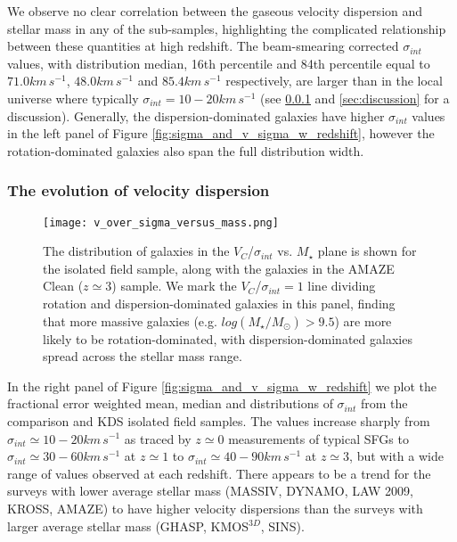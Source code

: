 \documentclass[fleqn,usenatbib]{mnras}
\begin{document}
\noindent
We observe no clear correlation between the gaseous velocity dispersion and stellar mass in any of the sub-samples, highlighting the complicated relationship between these quantities at high redshift.
The beam-smearing corrected $\sigma_{int}$ values, with distribution median, 16th percentile and 84th percentile equal to $71.0km\,s^{-1}$, $48.0km\,s^{-1}$ and $85.4km\,s^{-1}$ respectively, are larger than in the local universe where typically $\sigma_{int} = 10-20km\,s^{-1}$ \citep{Epinat2008a} (see \cref{subsubsec:sigma_evolution} and \cref{sec:discussion} for a discussion).
Generally, the dispersion-dominated galaxies have higher $\sigma_{int}$ values in the left panel of Figure \ref{fig:sigma_and_v_sigma_w_redshift}, however the rotation-dominated galaxies also span the full distribution width.

\subsubsection{The evolution of velocity dispersion}\label{subsubsec:sigma_evolution}

\begin{figure}
    \centering \hspace{-1.13cm}
    \texttt{[image: v\_over\_sigma\_versus\_mass.png]}
    \caption{The distribution of galaxies in the $V_{C}$/$\sigma_{int}$ vs. $M_{\star}$ plane is shown for the isolated field sample, along with the galaxies in the AMAZE Clean ($z\simeq3$) sample.
    We mark the $V_{C}$/$\sigma_{int}=1$ line dividing rotation and dispersion-dominated galaxies in this panel, finding that more massive galaxies (e.g. $log(M_{\star}/M_{\odot}) > 9.5$) are more likely to be rotation-dominated, with dispersion-dominated galaxies spread across the stellar mass range.}
    \label{fig:v_sig_and_v}
\end{figure}

In the right panel of Figure \ref{fig:sigma_and_v_sigma_w_redshift} we plot the fractional error weighted mean, median and distributions of $\sigma_{int}$ from the comparison and KDS isolated field samples.
The values increase sharply from $\sigma_{int}\simeq10-20km\,s^{-1}$ as traced by $z\simeq0$ measurements of typical SFGs to $\sigma_{int}\simeq30-60km\,s^{-1}$ at $z\simeq1$ to $\sigma_{int}\simeq40-90km\,s^{-1}$ at $z\simeq3$, but with a wide range of values observed at each redshift.
There appears to be a trend for the surveys with lower average stellar mass (MASSIV, DYNAMO, LAW 2009, KROSS, AMAZE) to have higher velocity dispersions than the surveys with larger average stellar mass (GHASP, KMOS$^{3D}$, SINS).
\end{document}
